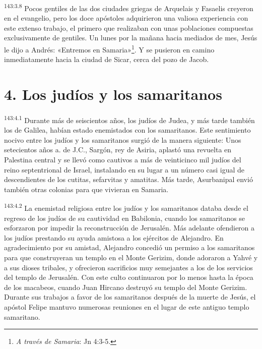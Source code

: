 \par 
\textsuperscript{143:3.8} Pocos gentiles de las dos ciudades griegas de Arquelais y Fasaelis creyeron en el evangelio, pero los doce apóstoles adquirieron una valiosa experiencia con este extenso trabajo, el primero que realizaban con unas poblaciones compuestas exclusivamente de gentiles. Un lunes por la mañana hacia mediados de mes, Jesús le dijo a Andrés: «Entremos en Samaria»\footnote{\textit{A través de Samaria}: Jn 4:3-5.}. Y se pusieron en camino inmediatamente hacia la ciudad de Sicar, cerca del pozo de Jacob.

\section*{4. Los judíos y los samaritanos}
\par 
\textsuperscript{143:4.1} Durante más de seiscientos años, los judíos de Judea, y más tarde también los de Galilea, habían estado enemistados con los samaritanos. Este sentimiento nocivo entre los judíos y los samaritanos surgió de la manera siguiente: Unos setecientos años a. de J.C., Sargón, rey de Asiria, aplastó una revuelta en Palestina central y se llevó como cautivos a más de veinticinco mil judíos del reino septentrional de Israel, instalando en su lugar a un número casi igual de descendientes de los cutitas, sefarvitas y amatitas. Más tarde, Asurbanipal envió también otras colonias para que vivieran en Samaria.

\par 
\textsuperscript{143:4.2} La enemistad religiosa entre los judíos y los samaritanos databa desde el regreso de los judíos de su cautividad en Babilonia, cuando los samaritanos se esforzaron por impedir la reconstrucción de Jerusalén. Más adelante ofendieron a los judíos prestando su ayuda amistosa a los ejércitos de Alejandro. En agradecimiento por su amistad, Alejandro concedió un permiso a los samaritanos para que construyeran un templo en el Monte Gerizim, donde adoraron a Yahvé y a sus dioses tribales, y ofrecieron sacrificios muy semejantes a los de los servicios del templo de Jerusalén. Con este culto continuaron por lo menos hasta la época de los macabeos, cuando Juan Hircano destruyó su templo del Monte Gerizim. Durante sus trabajos a favor de los samaritanos después de la muerte de Jesús, el apóstol Felipe mantuvo numerosas reuniones en el lugar de este antiguo templo samaritano.

